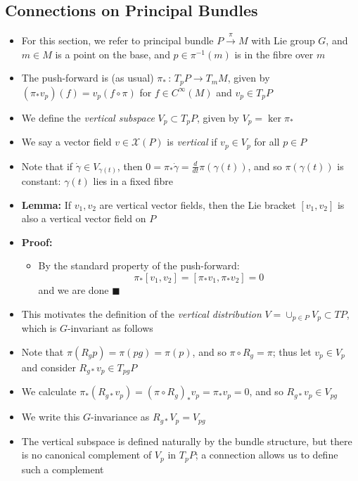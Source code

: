 \documentclass[12pt,a4paper]{article}
\numberwithin{equation}{section}
\begin{document}
	\subsection{Connections on Principal Bundles}
	\begin{itemize}
		\item For this section, we refer to principal bundle $P\xrightarrow{\pi}M$ with Lie group $G$, and $m\in M$ is a point on the base, and $p\in \pi^{-1}(m)$ is in the fibre over $m$
		\item The push-forward is (as usual) $\pi_{*}\,:\,T_{p}P\to T_{m}M$, given by $(\pi_{*}v_{p})(f)=v_{p}(f\circ\pi)$ for $f\in C^{\infty}(M)$ and $v_{p}\in T_{p}P$
		\item We define the \textit{vertical subspace} $V_{p}\subset T_{p}P$, given by $V_{p}=\ker{\pi_{*}}$
		\item We say a vector field $v\in\mathcal{X}(P)$ is \textit{vertical} if $v_{p}\in V_{p}$ for all $p\in P$
		\item Note that if $\dot{\gamma}\in V_{\gamma(t)}$, then $0=\pi_{*}\dot{\gamma}=\frac{d}{dt}\pi(\gamma(t))$, and so $\pi(\gamma(t))$ is constant: $\gamma(t)$ lies in a fixed fibre
		\item \textbf{Lemma:} If $v_{1},v_{2}$ are vertical vector fields, then the Lie bracket $[v_{1},v_{2}]$ is also a vertical vector field on $P$
		\item \textbf{Proof:}
		\begin{itemize}
			\item By the standard property of the push-forward:
			$$
			\pi_{*}[v_{1},v_{2}]=[\pi_{*}v_{1},\pi_{*}v_{2}]=0
			$$
			and we are done $\blacksquare$
		\end{itemize}
		\item This motivates the definition of the \textit{vertical distribution} $V=\cup_{p\in P}V_{p}\subset TP$, which is $G$-invariant as follows
		\item Note that $\pi(R_{g}p)=\pi(pg)=\pi(p)$, and so $\pi\circ R_{g}=\pi$; thus let $v_{p}\in V_{p}$ and consider $R_{g*}v_{p}\in T_{pg}P$
		\item We calculate $\pi_{*}(R_{g*}v_{p})=(\pi\circ R_{g})_{*}v_{p}=\pi_{*}v_{p}=0$, and so $R_{g*}v_{p}\in V_{pg}$
		\item We write this $G$-invariance as $R_{g*}V_{p}=V_{pg}$
		\item The vertical subspace is defined naturally by the bundle structure, but there is no canonical complement of $V_{p}$ in $T_{p}P$; a connection allows us to define such a complement

\end{itemize}
\end{document}
